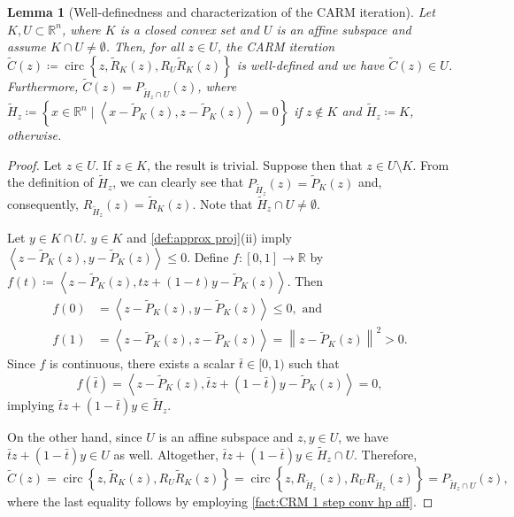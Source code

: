 \documentclass[smallextended,numbook,nospthms]{svjour3}
\theoremstyle{plain}
\newtheorem{lemma}[theorem]{Lemma}
\theoremstyle{definition}
\def\RR{\mathds R}
\newcommand{\scal}[2]{\left\langle{#1},{#2}  \right\rangle}
\DeclareMathOperator{\circum}{circ}
\begin{document}
\begin{lemma}[Well-definedness and characterization of the CARM iteration] \label{lem:CARM well-def char} 
	Let $K, U \subset \RR^{n}$, where $K$ is a closed convex set and $U$ is an affine subspace and assume $K \cap U \not = \emptyset$. Then, for all $z \in U$, the CARM iteration $\tilde{C}(z)\coloneqq \circum\left\{z, \tilde{R}_{K}(z), R_{U}\tilde{R}_{K}(z)\right\}$ is well-defined and we have $\tilde{C}(z) \in U$. Furthermore, $\tilde{C}(z)=P_{\tilde{H}_{z} \cap U}(z)$,
	where $\tilde{H}_{z}\coloneqq \left\{x \in \RR^{n} \mid \scal{x-\tilde{P}_{K}(z)}{z-\tilde{P}_{K}(z)}=0\right\}$ if $z \notin K$ and $\tilde{H}_{z}\coloneqq K$, otherwise.
\end{lemma}
	\begin{proof}

	Let $z \in U$. If $z \in K$, the result is trivial. Suppose then that $z \in U \setminus K$. From the definition of $\tilde{H}_{z}$, we can clearly see that  $P_{\tilde{H}_{z}}(z)=\tilde{P}_{K}(z)$ and, consequently, $R_{\tilde{H}_{z}}(z)=\tilde{R}_{K}(z)$. Note that $\tilde{H}_{z} \cap U \neq \emptyset$.
	
	Let $y \in K \cap U$.
	$y \in K$ and \cref{def:approx proj}(ii) imply $\scal{z-\tilde{P}_{K}(z)}{y-\tilde{P}_{K}(z)} \leq 0$.
	Define $f:[0,1] \rightarrow \RR$ by $f(t)\coloneqq \scal{z-\tilde{P}_{K}(z)}{tz+(1-t) y-\tilde{P}_{K}(z)}$.
	Then 
	\begin{align}
			f(0)&=\scal{z-\tilde{P}_{K}(z)}{y-\tilde{P}_{K}(z)} \leq 0, \text{ and}\\
			f(1)&=\scal{z-\tilde{P}_{K}(z)}{z-\tilde{P}_{K}(z)}=\left\|z-\tilde{P}_{K}(z)\right\|^{2}>0.
	\end{align}
	Since $f$ is continuous, there exists a scalar $\bar{t} \in[0,1)$ such that
	\[
	f(\bar{t})=\scal{z-\tilde{P}_{K}(z)}{\bar{t} z+(1-\bar{t}) y-\tilde{P}_{K}(z)}=0,
	\]
	implying $\bar{t} z+(1-\bar{t}) y \in \tilde{H}_{z}$.
	
	On the other hand, since $U$ is an affine subspace and $z, y \in U$, we have $\bar{t}z+(1-\bar{t})y \in U$ as well.
	Altogether, $\bar{t} z+(1-\bar{t}) y \in \tilde{H}_{z} \cap U$.
	Therefore, \[\tilde{C}(z)=\circum\left\{z, \tilde{R}_{K}(z), R_{U}\tilde{R}_{K}(z)\right\}=\circum\left\{z, R_{\tilde{H}_{z}}(z), R_{U}R_{\tilde{H}_{z}}(z)\right\}=P_{\tilde{H}_{z} \cap U}(z),\] where
	the last equality follows by employing  \cref{fact:CRM 1 step conv hp aff}.
\end{proof}
\end{document}
